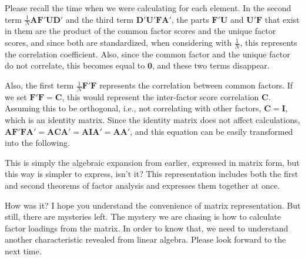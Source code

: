 \documentclass{ltjsbook}
\begin{document}
Please recall the time when we were calculating for each element. In the second term $\frac{1}{N} \bm{A} \bm{F}'\bm{U} \bm{D}'$ and the third term $\bm{D}' \bm{U}' \bm{F} \bm{A}'$, the parts $\bm{F}' \bm{U}$ and $\bm{U}' \bm{F}$ that exist in them are the product of the common factor scores and the unique factor scores, and since both are standardized, when considering with $\frac{1}{N}$, this represents the correlation coefficient. Also, since the common factor and the unique factor do not correlate, this becomes equal to $\bm{0}$, and these two terms disappear.

Also, the first term $\frac{1}{N}\bm{F} ' \bm{F}$ represents the correlation between common factors. If we set $\bm{F'F}=\bm{C}$, this would represent the inter-factor score correlation $\bm{C}$. Assuming this to be orthogonal, i.e., not correlating with other factors, $\bm{C} = \bm{I}$, which is an identity matrix. Since the identity matrix does not affect calculations, $\bm{AF'FA'}=\bm{ACA'}=\bm{AIA'}=\bm{AA'}$, and this equation can be easily transformed into the following.


This is simply the algebraic expansion from earlier, expressed in matrix form, but this way is simpler to express, isn't it? This representation includes both the first and second theorems of factor analysis and expresses them together at once.

How was it? I hope you understand the convenience of matrix representation. But still, there are mysteries left. The mystery we are chasing is how to calculate factor loadings from the matrix. In order to know that, we need to understand another characteristic revealed from linear algebra. Please look forward to the next time.
\end{document}
